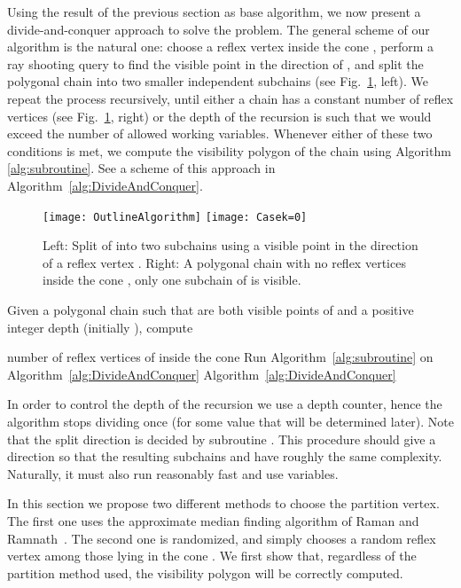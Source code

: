 \documentclass[a4paper]{article}
\begin{document}
Using the result of the previous section as base algorithm, we now present a divide-and-conquer approach to solve the problem. The general scheme of our algorithm is the natural one: choose a reflex vertex  inside the cone , perform a ray shooting query to find the visible point in the direction of , and split the polygonal chain into two smaller independent subchains  (see Fig.~\ref{fig:OutlineAlgorithm}, left). We repeat the process recursively, until either 
 a chain  has a constant number of reflex vertices (see Fig.~\ref{fig:OutlineAlgorithm}, right) or 
 the depth of the recursion is such that we would exceed the number of allowed working variables. 
Whenever either of these two conditions is met, we compute the visibility polygon of the chain using Algorithm \ref{alg:subroutine}. See a scheme of this approach in Algorithm~\ref{alg:DivideAndConquer}.




\begin{figure}[tb]
\centering
\texttt{[image: OutlineAlgorithm]}
\texttt{[image: Casek=0]}
\caption{Left: Split of  into two subchains  using a visible point  in the direction of a reflex vertex .
Right: A polygonal chain  with no reflex vertices inside the cone , only one subchain of  is visible. }
\label{fig:OutlineAlgorithm}
\end{figure}

\begin{algorithm}
\caption{Given a polygonal chain  such that  are both visible points of  and a positive integer depth  (initially ), compute }
\label{alg:DivideAndConquer}
\begin{algorithmic}[1]
\STATE  number of reflex vertices of  inside the cone 
	\STATE\label{algoconst} Run Algorithm~\ref{alg:subroutine} on 
\ELSE
	\STATE 
\STATE 
	\STATE Algorithm~\ref{alg:DivideAndConquer}
	\STATE Algorithm~\ref{alg:DivideAndConquer}
\ENDIF
\end{algorithmic}
\end{algorithm}


In order to control the depth of the recursion we use a depth counter, hence the algorithm stops dividing once  (for some value  that will be determined later). Note that the split direction is decided by subroutine . This procedure should give a direction so that the resulting subchains  and  have roughly the same complexity. Naturally, it must also run reasonably fast and use  variables.

In this section we propose two different methods to choose the partition vertex. The first one uses the approximate median finding algorithm of  Raman and Ramnath~\cite{rr-iubtstsls-98}. The second one is randomized, and simply chooses a random reflex vertex among those lying in the cone . We first show that, regardless of the partition method used, the visibility polygon will be correctly computed. 
\end{document}
